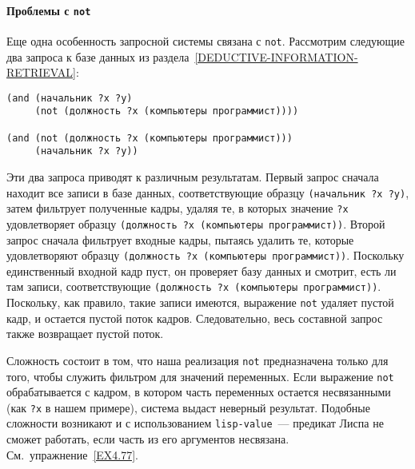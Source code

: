 \paragraph{Проблемы с {\tt not}}


Еще одна особенность запросной системы связана с 
{\tt not}.
Рассмотрим следующие два запроса к базе данных из
раздела~\ref{DEDUCTIVE-INFORMATION-RETRIEVAL}:

\begin{Verbatim}[fontsize=\small]
(and (начальник ?x ?y)
     (not (должность ?x (компьютеры программист))))

(and (not (должность ?x (компьютеры программист)))
     (начальник ?x ?y))
\end{Verbatim}
Эти два запроса приводят к различным результатам.  Первый запрос
сначала находит все записи в базе данных, соответствующие образцу
{\tt (начальник ?x ?y)}, затем фильтрует полученные
кадры, удаляя те, в которых значение {\tt ?x} удовлетворяет
образцу {\tt (должность ?x (компьютеры программист))}.  Второй
запрос сначала фильтрует входные кадры, пытаясь удалить те, которые
удовлетворяют образцу {\tt (должность ?x (компьютеры
программист))}.  Поскольку единственный входной кадр пуст, он
проверяет базу данных и смотрит, есть ли там записи, соответствующие
{\tt (должность ?x (компьютеры программист))}.  Поскольку, как
правило, такие записи имеются, выражение {\tt not} удаляет
пустой кадр, и остается пустой поток кадров.  Следовательно, весь
составной запрос также возвращает пустой поток.

Сложность состоит в том, что наша реализация
{\tt not} предназначена только для того, чтобы служить фильтром
для значений переменных.  Если выражение {\tt not}
обрабатывается с кадром, в котором часть переменных остается
несвязанными (как {\tt ?x} в нашем примере), система выдаст
неверный результат.  Подобные сложности возникают и с использованием
{\tt lisp-value}~--- предикат 
Лиспа не сможет работать, если часть из его аргументов несвязана.  
См.~упражнение~\ref{EX4.77}.


